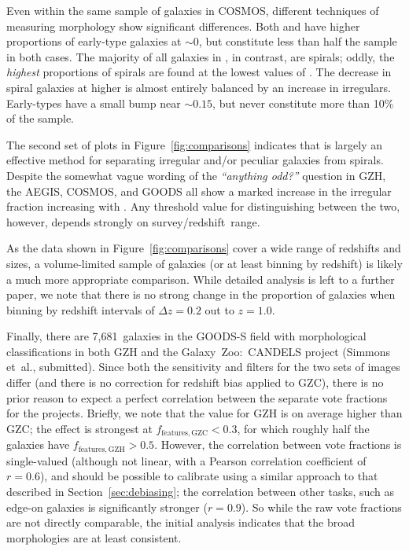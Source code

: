 \documentclass[twocolumn]{aastex6}
\begin{document}
Even within the same sample of galaxies in COSMOS, different techniques of
measuring morphology show significant differences. Both \citet{cas07} and
\citet{tas11} have higher proportions of early-type galaxies at \fbest$\sim0$,
but constitute less than half the sample in both cases. The majority of all
galaxies in \citet{sca07}, in contrast, are spirals; oddly, the \emph{highest}
proportions of spirals are found at the lowest values of \fbest. The decrease
in spiral galaxies at higher \fbest{} is almost entirely balanced by an
increase in irregulars. Early-types have a small bump near \fbest$\sim0.15$,
but never constitute more than 10\% of the sample. 

The second set of plots in Figure~\ref{fig:comparisons} indicates that \fodd{}
is largely an effective method for separating irregular and/or peculiar
galaxies from spirals. Despite the somewhat vague wording of the {\it
``anything odd?''} question in GZH, the AEGIS, COSMOS, and GOODS all show a
marked increase in the irregular fraction increasing with \fodd. Any threshold
value for distinguishing between the two, however, depends strongly on
survey/redshift~range. 

As the data shown in Figure~\ref{fig:comparisons} cover a wide range of
redshifts and sizes, a volume-limited sample of galaxies (or at least binning
by redshift) is likely a much more appropriate comparison. While detailed
analysis is left to a further paper, we note that there is no strong change in
the proportion of galaxies when binning by redshift intervals of $\Delta z=0.2$
out to $z=1.0$. 

Finally, there are 7,681~galaxies in the GOODS-S field with morphological
classifications in both GZH and the Galaxy~Zoo:~CANDELS project (Simmons
et~al., submitted). Since both the sensitivity and filters for the two sets of
images differ (and there is no correction for redshift bias applied to GZC), there is no
prior reason to expect a perfect correlation between the separate vote
fractions for the projects. Briefly, we note that the \ffeatures{} value for
GZH is on average higher than GZC; the effect is strongest at
$f_\mathrm{features,GZC}<0.3$, for which roughly half the galaxies have
$f_\mathrm{features,GZH}>0.5$. However, the correlation between vote fractions
is single-valued (although not linear, with a Pearson correlation coefficient
of $r=0.6$), and should be possible to calibrate using a similar approach to
that described in Section~\ref{sec:debiasing}; the correlation between other
tasks, such as edge-on galaxies is significantly stronger ($r=0.9$). So while
the raw vote fractions are not directly comparable, the initial analysis
indicates that the broad morphologies are at least consistent.
\end{document}
